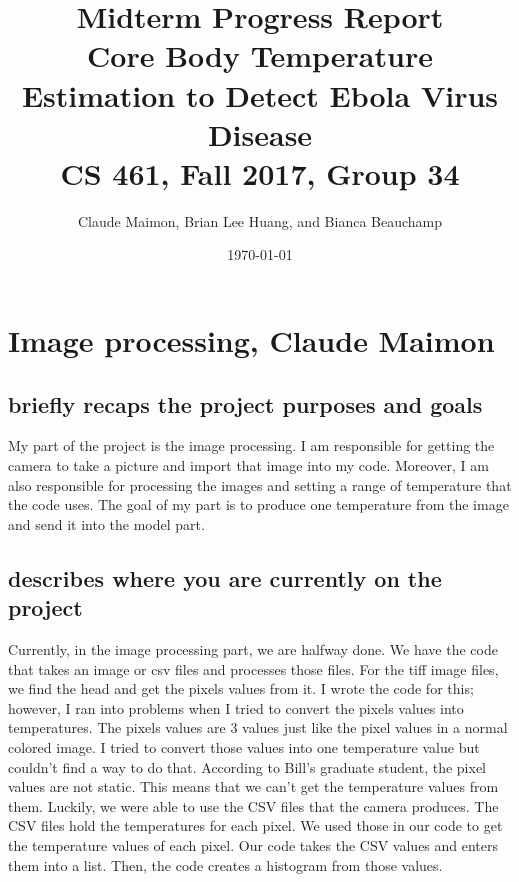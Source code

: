 \documentclass[onecolumn, draftclsnofoot,10pt, compsoc]{IEEEtran}
\title{%
  Midterm Progress Report \\
  \vspace{0.4cm}
  \large Core Body Temperature Estimation to Detect Ebola Virus Disease \\
  \vspace{0.4cm}
  \large CS 461, Fall 2017, Group 34\\
    }
\author{Claude Maimon, Brian Lee Huang, and Bianca Beauchamp}
\date{\today}
\begin{document}
\maketitle

\begin{abstract}

\end{abstract}

\newpage

\tableofcontents
\newpage


\section{Image processing, Claude Maimon}

\subsection{briefly recaps the project purposes and goals}
My part of the project is the image processing. I am responsible for getting the camera to take a picture and import that image into my code. Moreover, I am also responsible for processing the images and setting a range of temperature that the code uses. The goal of my part is to produce one temperature from the image and send it into the model part. 


\subsection{describes where you are currently on the project}
Currently, in the image processing part, we are halfway done. We have the code that takes an image or csv files and processes those files. For the tiff image files, we find the head and get the pixels values from it. I wrote the code for this; however, I ran into problems when I tried to convert the pixels values into temperatures. The pixels values are 3 values just like the pixel values in a normal colored image. I tried to convert those values into one temperature value but couldn’t find a way to do that. According to Bill’s graduate student, the pixel values are not static. This means that we can’t get the temperature values from them. Luckily, we were able to use the CSV files that the camera produces. The CSV files hold the temperatures for each pixel. We used those in our code to get the temperature values of each pixel.  Our code takes the CSV values and enters them into a list. Then, the code creates a histogram from those values. 
\end{document}
